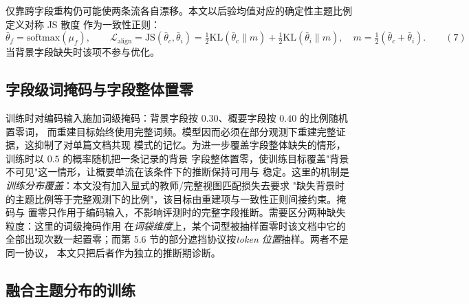 \documentclass{article}
\begin{document}
仅靠跨字段重构仍可能使两条流各自漂移。本文以后验均值对应的确定性主题比例定义对称 JS 散度
作为一致性正则：
\begin{equation}
\bar\theta_f=\mathrm{softmax}(\mu_f),\qquad
\mathcal{L}_{\mathrm{align}}
=\mathrm{JS}(\bar\theta_c,\bar\theta_i)
=\tfrac12\mathrm{KL}(\bar\theta_c\parallel m)+\tfrac12\mathrm{KL}(\bar\theta_i\parallel m),
\quad m=\tfrac12(\bar\theta_c+\bar\theta_i).
\qquad(7)\end{equation}
当背景字段缺失时该项不参与优化。

\subsection{字段级词掩码与字段整体置零}

训练时对编码输入施加词级掩码：背景字段按 $0.30$、概要字段按 $0.40$ 的比例随机置零词，
而重建目标始终使用完整词频。模型因而必须在部分观测下重建完整证据，这抑制了对单篇文档共现
模式的记忆。为进一步覆盖字段整体缺失的情形，训练时以 $0.5$ 的概率随机把一条记录的背景
字段整体置零，使训练目标覆盖"背景不可见"这一情形，让概要单流在该条件下的推断保持可用与
稳定。这里的机制是\emph{训练分布覆盖}：本文没有加入显式的教师/完整视图匹配损失去要求
"缺失背景时的主题比例等于完整观测下的比例"，该目标由重建项与一致性正则间接约束。掩码与
置零只作用于编码输入，不影响评测时的完整字段推断。需要区分两种缺失粒度：这里的词级掩码作用
在\emph{词袋维度}上，某个词型被抽样置零时该文档中它的全部出现次数一起置零；而第
5.6 节的部分遮挡协议按\emph{token 位置}抽样。两者不是同一协议，
本文只把后者作为独立的推断期诊断。

\subsection{融合主题分布的训练}
\end{document}
